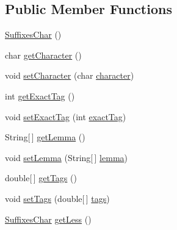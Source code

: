 \subsection*{Public Member Functions}
\begin{DoxyCompactItemize}
\item 
\hyperlink{classbr_1_1usp_1_1cata_1_1util_1_1lemmatizer_1_1_suffixes_char_a6f27cf3dd1df305ab4cfb2b9be92920b}{Suffixes\+Char} ()
\item 
char \hyperlink{classbr_1_1usp_1_1cata_1_1util_1_1lemmatizer_1_1_suffixes_char_a84dc1c4751856834a0219e7ce367bc82}{get\+Character} ()
\item 
void \hyperlink{classbr_1_1usp_1_1cata_1_1util_1_1lemmatizer_1_1_suffixes_char_aa5b75324c9fb831acca507d6b2521e12}{set\+Character} (char \hyperlink{classbr_1_1usp_1_1cata_1_1util_1_1lemmatizer_1_1_suffixes_char_af6c45eb644777282e0e16610045399c7}{character})
\item 
int \hyperlink{classbr_1_1usp_1_1cata_1_1util_1_1lemmatizer_1_1_suffixes_char_a6af30a58b95c08ca17aa0dc131532137}{get\+Exact\+Tag} ()
\item 
void \hyperlink{classbr_1_1usp_1_1cata_1_1util_1_1lemmatizer_1_1_suffixes_char_a55e4ab4e3cb5fa9112459e72c6b92e40}{set\+Exact\+Tag} (int \hyperlink{classbr_1_1usp_1_1cata_1_1util_1_1lemmatizer_1_1_suffixes_char_a7ad5f2b1449ee2407e6ee941ae92c4bc}{exact\+Tag})
\item 
String\mbox{[}$\,$\mbox{]} \hyperlink{classbr_1_1usp_1_1cata_1_1util_1_1lemmatizer_1_1_suffixes_char_af612e28c94e2332317047714685a3f5b}{get\+Lemma} ()
\item 
void \hyperlink{classbr_1_1usp_1_1cata_1_1util_1_1lemmatizer_1_1_suffixes_char_af5b7eb267888aa1a0cbf4ee708546b3a}{set\+Lemma} (String\mbox{[}$\,$\mbox{]} \hyperlink{classbr_1_1usp_1_1cata_1_1util_1_1lemmatizer_1_1_suffixes_char_a7d0da1fb5b1dff43e3ae87d85e2cb471}{lemma})
\item 
double\mbox{[}$\,$\mbox{]} \hyperlink{classbr_1_1usp_1_1cata_1_1util_1_1lemmatizer_1_1_suffixes_char_a64a2685345fb553123450ee3ac5c4685}{get\+Tags} ()
\item 
void \hyperlink{classbr_1_1usp_1_1cata_1_1util_1_1lemmatizer_1_1_suffixes_char_a8227918f484873bf4b2f061779d544ce}{set\+Tags} (double\mbox{[}$\,$\mbox{]} \hyperlink{classbr_1_1usp_1_1cata_1_1util_1_1lemmatizer_1_1_suffixes_char_a3a403a4cc19ce7a9c5d0c279b7a06632}{tags})
\item 
\hyperlink{classbr_1_1usp_1_1cata_1_1util_1_1lemmatizer_1_1_suffixes_char}{Suffixes\+Char} \hyperlink{classbr_1_1usp_1_1cata_1_1util_1_1lemmatizer_1_1_suffixes_char_ac658d5bb195c1c36d460c3646c820d8c}{get\+Less} ()

\end{DoxyCompactItemize}
